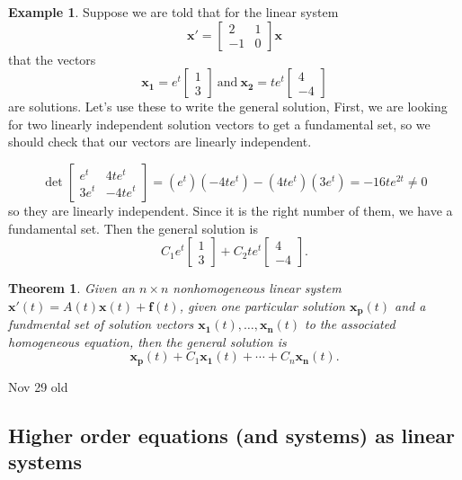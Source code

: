 \documentclass[12pt]{amsart}
\numberwithin{equation}{section}
\theoremstyle{plain} %
\newtheorem{thm}[equation]{Theorem}
\newcommand{\Nov}[1]{Nov #1 old}
\theoremstyle{definition}
\newtheorem{ex}[equation]{Example}
\theoremstyle{remark}
\begin{document}
\begin{ex} Suppose we are told that for the linear system 
\[ \mathbf{x'} = \begin{bmatrix} 2 & 1 \\ -1 & 0\end{bmatrix} \mathbf{x}\] that the vectors 
\[ \mathbf{x_1} = e^{t} \begin{bmatrix} 1\\3 \end{bmatrix} \ \text{and} \ \mathbf{x_2} = te^{t} \begin{bmatrix} 4\\-4 \end{bmatrix}\]
are solutions. Let's use these to write the general solution, First, we are looking for two linearly independent solution vectors to get a fundamental set, so we should check that our vectors are linearly independent.

\[ \det\begin{bmatrix} e^t & 4 t e^t \\ 3 e^t & -4 t e^t\end{bmatrix} = (e^t)(-4 t e^t) - (4 t e^t)(3 e^t) = -16 t e^{2t} \neq 0\]
so they are linearly independent. Since it is the right number of them, we have a fundamental set. Then the general solution is
\[ C_1 e^{t} \begin{bmatrix} 1\\3 \end{bmatrix} + C_2 te^{t} \begin{bmatrix} 4\\-4 \end{bmatrix}.\]
\end{ex}

\begin{thm} Given an $n\times n$ nonhomogeneous linear system $\mathbf{x'}(t) =A(t) \mathbf{x}(t) + \mathbf{f}(t)$, given one particular solution $\mathbf{x_p}(t)$ and
a fundmental set of solution vectors $\mathbf{x_1}(t),\dots,\mathbf{x_n}(t)$ to the associated homogeneous equation, then the general solution is
\[ \mathbf{x_p}(t) + C_1 \mathbf{x_1}(t) +\cdots + C_n \mathbf{x_n}(t).\]
\end{thm}



\Nov{29}

\subsection*{Higher order equations (and systems) as linear systems}
\end{document}
